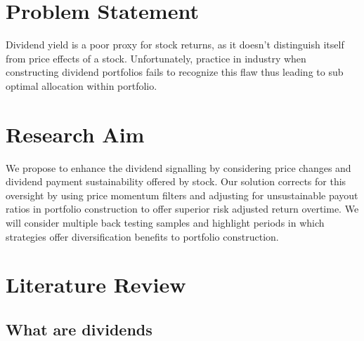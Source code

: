 \documentclass[11pt,preprint, authoryear]{elsarticle}
\numberwithin{equation}{section}
\numberwithin{figure}{section}
\numberwithin{table}{section}
\begin{document}
\hypertarget{problem-statement}{%
\section*{Problem Statement}\label{problem-statement}}

Dividend yield is a poor proxy for stock returns, as it doesn't
distinguish itself from price effects of a stock. Unfortunately,
practice in industry when constructing dividend portfolios fails to
recognize this flaw thus leading to sub optimal allocation within
portfolio.

\hypertarget{research-aim}{%
\section*{Research Aim}\label{research-aim}}

We propose to enhance the dividend signalling by considering price
changes and dividend payment sustainability offered by stock. Our
solution corrects for this oversight by using price momentum filters and
adjusting for unsustainable payout ratios in portfolio construction to
offer superior risk adjusted return overtime. We will consider multiple
back testing samples and highlight periods in which strategies offer
diversification benefits to portfolio construction.

\hypertarget{literature-review}{%
\section*{Literature Review}\label{literature-review}}

\hypertarget{what-are-dividends}{%
\subsection*{What are dividends}\label{what-are-dividends}}
\end{document}
